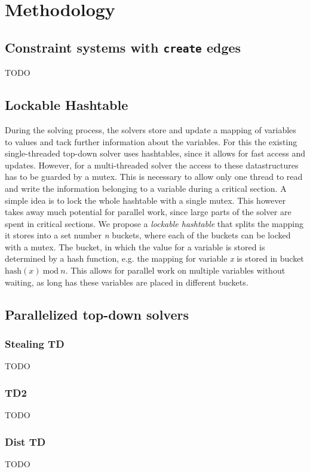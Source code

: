 \section{Methodology}
\label{sec:method}

  \subsection{Constraint systems with \texttt{create} edges}
  \label{sec:method:create}
  TODO

  \subsection{Lockable Hashtable}
  \label{sec:method:LHM}
  During the solving process, the solvers store and update a mapping of variables to values and tack further information about the variables. For this the existing single-threaded top-down solver uses hashtables, since it allows for fast access and updates. However, for a multi-threaded solver the access to these datastructures has to be guarded by a mutex. This is necessary to allow only one thread to read and write the information belonging to a variable during a critical section. 
  A simple idea is to lock the whole hashtable with a single mutex. This however takes away much potential for parallel work, since large parts of the solver are spent in critical sections.
  We propose a \textit{lockable hashtable} that splits the mapping it stores into a set number \textit{n} buckets, where each of the buckets can be locked with a mutex. The bucket, in which the value for a variable is stored is determined by a hash function, e.g. the mapping for variable \textit{x} is stored in bucket $\text{hash}(x)\ \text{mod}\ n$. This allows for parallel work on multiple variables without waiting, as long has these variables are placed in different buckets.

  \subsection{Parallelized top-down solvers}
  \label{sec:method:td_parallel}

    \subsubsection{Stealing TD}
    \label{sec:method:td_parallel:stealing}
    TODO

    \subsubsection{TD2}
    \label{sec:method:td_parallel:base}
    TODO

    \subsubsection{Dist TD}
    \label{sec:method:td_parallel:dist}
    TODO
